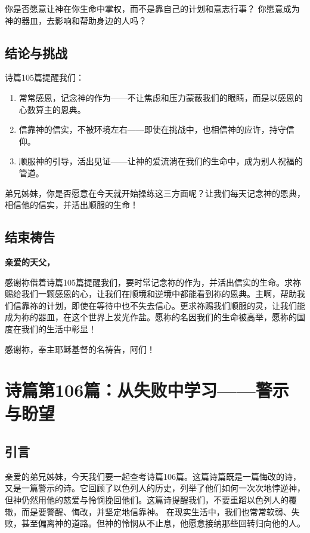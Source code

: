 \documentclass[a4paper, 12pt]{article}
\begin{document}
你是否愿意让神在你生命中掌权，而不是靠自己的计划和意志行事？
你愿意成为神的器皿，去影响和帮助身边的人吗？
\subsection*{结论与挑战}
诗篇105篇提醒我们：
\begin{enumerate}
    \item 常常感恩，记念神的作为——不让焦虑和压力蒙蔽我们的眼睛，而是以感恩的心数算主的恩典。

    \item 信靠神的信实，不被环境左右——即使在挑战中，也相信神的应许，持守信仰。

    \item 顺服神的引导，活出见证——让神的爱流淌在我们的生命中，成为别人祝福的管道。

\end{enumerate}

弟兄姊妹，你是否愿意在今天就开始操练这三方面呢？让我们每天记念神的恩典，相信他的信实，并活出顺服的生命！

\subsection*{结束祷告}
\textbf{亲爱的天父，}

感谢祢借着诗篇105篇提醒我们，要时常记念祢的作为，并活出信实的生命。求祢赐给我们一颗感恩的心，让我们在顺境和逆境中都能看到祢的恩典。主啊，帮助我们信靠祢的计划，即使在等待中也不失去信心。更求祢赐我们顺服的灵，让我们能成为祢的器皿，在这个世界上发光作盐。愿祢的名因我们的生命被高举，愿祢的国度在我们的生活中彰显！

感谢祢，奉主耶稣基督的名祷告，阿们！
\newpage
\section{诗篇第106篇：从失败中学习——警示与盼望}
\subsection*{引言}

亲爱的弟兄姊妹，今天我们要一起查考诗篇106篇。这篇诗篇既是一篇悔改的诗，又是一篇警示的诗。它回顾了以色列人的历史，列举了他们如何一次次地悖逆神，但神仍然用他的慈爱与怜悯挽回他们。这篇诗提醒我们，不要重蹈以色列人的覆辙，而是要警醒、悔改，并坚定地信靠神。
在现实生活中，我们也常常软弱、失败，甚至偏离神的道路。但神的怜悯从不止息，他愿意接纳那些回转归向他的人。
\end{document}
